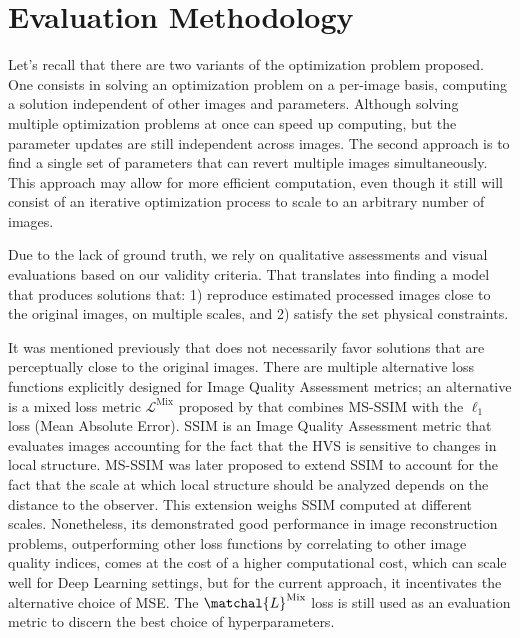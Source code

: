 \documentclass[nomenclature, english, bibtex]{kththesis}
\numberwithin{listing}{chapter}
\begin{document}
\section{Evaluation Methodology}

Let's recall that there are two variants of the optimization problem proposed. One consists in solving an optimization problem
on a per-image basis, computing a solution independent of other images and parameters. Although solving multiple optimization
problems at once can speed up computing, but the parameter updates are still independent across images. The second approach
is to find a single set of parameters that can revert multiple images simultaneously. This approach may allow for more efficient
computation, even though it still will consist of an iterative optimization process to scale to an arbitrary number of images.

Due to the lack of ground truth, we rely on qualitative assessments and visual evaluations based on our
validity criteria. That translates into finding a model that produces solutions that: 1) reproduce estimated processed
images close to the original images, on multiple scales, and 2) satisfy the set physical constraints.

It was mentioned previously that  does not necessarily favor solutions that are perceptually close
to the original images. There are multiple alternative loss functions explicitly designed for Image Quality Assessment
metrics; an alternative is a mixed loss metric $\mathcal{L}^\text{Mix}$ proposed by \cite{zhaoLossFunctionsImage2017} that combines
\acrfull{MS-SSIM} with the $\ell_1$ loss (Mean Absolute Error). \acrshort{SSIM} is an Image Quality Assessment
metric that evaluates images accounting for the fact that the \acrfull{HVS} is sensitive to changes in local
structure. \acrshort{MS-SSIM} was later proposed to extend \acrshort{SSIM} to account for the fact that the
scale at which local structure should be analyzed depends on the distance to the observer. This extension
weighs \acrshort{SSIM} computed at different scales. Nonetheless, its demonstrated good performance in image
reconstruction problems, outperforming other loss functions by correlating to other image quality indices,
comes at the cost of a higher computational cost, which can scale well for Deep Learning settings,
but for the current approach, it incentivates the alternative choice of \acrshort{MSE}. The $\matchal{L}^{\text{Mix}}$ loss
is still used as an evaluation metric to discern the best choice of hyperparameters.
\end{document}
